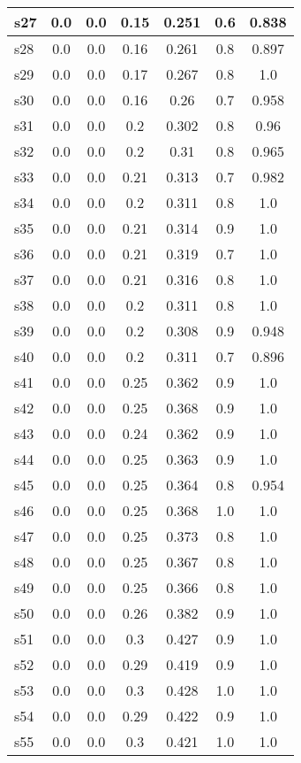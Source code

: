 \documentclass{article}
\begin{document}
\begin{tabular}{|l|c|c|c|c|c|c|}
\hline
s27 &0.0 & 0.0 & 0.15 & 0.251 & 0.6 & 0.838\\
\hline
s28 &0.0 & 0.0 & 0.16 & 0.261 & 0.8 & 0.897\\
\hline
s29 &0.0 & 0.0 & 0.17 & 0.267 & 0.8 & 1.0\\
\hline
s30 &0.0 & 0.0 & 0.16 & 0.26 & 0.7 & 0.958\\
\hline
s31 &0.0 & 0.0 & 0.2 & 0.302 & 0.8 & 0.96\\
\hline
s32 &0.0 & 0.0 & 0.2 & 0.31 & 0.8 & 0.965\\
\hline
s33 &0.0 & 0.0 & 0.21 & 0.313 & 0.7 & 0.982\\
\hline
s34 &0.0 & 0.0 & 0.2 & 0.311 & 0.8 & 1.0\\
\hline
s35 &0.0 & 0.0 & 0.21 & 0.314 & 0.9 & 1.0\\
\hline
s36 &0.0 & 0.0 & 0.21 & 0.319 & 0.7 & 1.0\\
\hline
s37 &0.0 & 0.0 & 0.21 & 0.316 & 0.8 & 1.0\\
\hline
s38 &0.0 & 0.0 & 0.2 & 0.311 & 0.8 & 1.0\\
\hline
s39 &0.0 & 0.0 & 0.2 & 0.308 & 0.9 & 0.948\\
\hline
s40 &0.0 & 0.0 & 0.2 & 0.311 & 0.7 & 0.896\\
\hline
s41 &0.0 & 0.0 & 0.25 & 0.362 & 0.9 & 1.0\\
\hline
s42 &0.0 & 0.0 & 0.25 & 0.368 & 0.9 & 1.0\\
\hline
s43 &0.0 & 0.0 & 0.24 & 0.362 & 0.9 & 1.0\\
\hline
s44 &0.0 & 0.0 & 0.25 & 0.363 & 0.9 & 1.0\\
\hline
s45 &0.0 & 0.0 & 0.25 & 0.364 & 0.8 & 0.954\\
\hline
s46 &0.0 & 0.0 & 0.25 & 0.368 & 1.0 & 1.0\\
\hline
s47 &0.0 & 0.0 & 0.25 & 0.373 & 0.8 & 1.0\\
\hline
s48 &0.0 & 0.0 & 0.25 & 0.367 & 0.8 & 1.0\\
\hline
s49 &0.0 & 0.0 & 0.25 & 0.366 & 0.8 & 1.0\\
\hline
s50 &0.0 & 0.0 & 0.26 & 0.382 & 0.9 & 1.0\\
\hline
s51 &0.0 & 0.0 & 0.3 & 0.427 & 0.9 & 1.0\\
\hline
s52 &0.0 & 0.0 & 0.29 & 0.419 & 0.9 & 1.0\\
\hline
s53 &0.0 & 0.0 & 0.3 & 0.428 & 1.0 & 1.0\\
\hline
s54 &0.0 & 0.0 & 0.29 & 0.422 & 0.9 & 1.0\\
\hline
s55 &0.0 & 0.0 & 0.3 & 0.421 & 1.0 & 1.0\\

\end{tabular}
\end{document}

